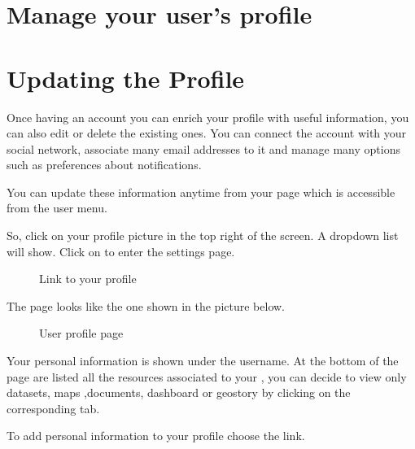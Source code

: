 \documentclass[letterpaper,10pt,english]{sphinxmanual}
\begin{document}
\section{Manage your user’s profile}
\label{\detokenize{01_welcome:manage-your-user-s-profile}}

\section{Updating the Profile}
\label{\detokenize{01_welcome:updating-the-profile}}
\sphinxAtStartPar
Once having an account you can enrich your profile with useful information, you can also edit or delete the existing ones.
You can connect the account with your social network, associate many e\sphinxhyphen{}mail addresses to it and manage many options such as preferences about notifications.

\sphinxAtStartPar
You can update these information anytime from your  page which is accessible from the user menu.

\sphinxAtStartPar
So, click on your profile picture in the top right of the screen. A drop\sphinxhyphen{}down list will show. Click on  to enter the  settings page.

\begin{figure}[htbp]
\centering
\capstart

\noindent{}
\caption{Link to your profile}\label{\detokenize{01_welcome:id6}}\end{figure}

\sphinxAtStartPar
The  page looks like the one shown in the picture below.

\begin{figure}[htbp]
\centering
\capstart

\noindent{}
\caption{User profile page}\label{\detokenize{01_welcome:id7}}\end{figure}

\sphinxAtStartPar
Your personal information is shown under the username.
At the bottom of the page are listed all the resources associated to your , you can decide to view only datasets, maps ,documents, dashboard or geostory by clicking on the corresponding tab.

\sphinxAtStartPar
To add personal information to your profile choose the  link.
\end{document}
